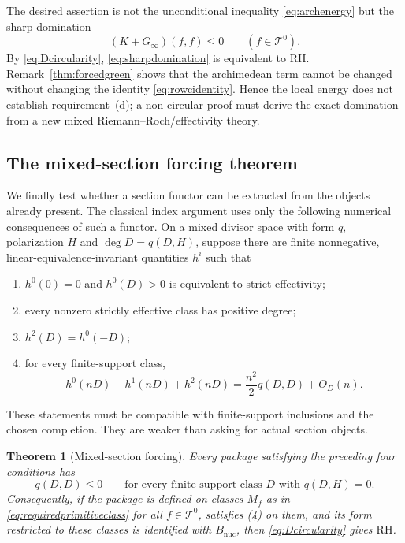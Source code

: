 \documentclass[11pt]{amsart}
\newtheorem{theorem}{Theorem}[section]
\theoremstyle{definition}
\theoremstyle{remark}
\newcommand{\RH}{\mathrm{RH}}
\begin{document}
The desired assertion is not the unconditional inequality
\eqref{eq:archenergy} but the sharp domination
\begin{equation}\label{eq:sharpdomination}
 (K+G_\infty)(f,f)\le0\qquad(f\in\mathcal T^0).
\end{equation}
By \eqref{eq:Dcircularity}, \eqref{eq:sharpdomination} is equivalent to
$\RH$.  Remark~\ref{thm:forcedgreen} shows that the archimedean term cannot
be changed without changing the identity \eqref{eq:rowcidentity}.  Hence the
local energy does not establish requirement~(d); a non-circular proof must derive the exact domination from a
new mixed Riemann--Roch/effectivity theory.

\subsection{The mixed-section forcing theorem}

We finally test whether a section functor can be extracted from the objects
already present.  The classical index argument uses only the following
numerical consequences of such a functor.  On a mixed divisor space with
form $q$, polarization $H$ and $\deg D=q(D,H)$, suppose there are finite
nonnegative, linear-equivalence-invariant quantities $h^i$ such that
\begin{enumerate}
\item $h^0(0)=0$ and $h^0(D)>0$ is equivalent to strict effectivity;
\item every nonzero strictly effective class has positive degree;
\item $h^2(D)=h^0(-D)$;
\item for every finite-support class,
\begin{equation}\label{eq:mixedRRminimum}
 h^0(nD)-h^1(nD)+h^2(nD)
 =\frac{n^2}{2}q(D,D)+O_D(n).
\end{equation}
\end{enumerate}
These statements must be compatible with finite-support inclusions and the
chosen completion.  They are weaker than asking for actual section objects.

\begin{theorem}[Mixed-section forcing]
\label{thm:mixedsectionforcing}
Every package satisfying the preceding four conditions has
\[
 q(D,D)\le0\qquad\text{for every finite-support class $D$ with }q(D,H)=0.
\]
Consequently, if the package is defined on classes $M_f$ as in
\eqref{eq:requiredprimitiveclass} for all $f\in\mathcal T^0$, satisfies (4)
on them, and its form restricted to these classes is identified with
$B_{\mathrm{nuc}}$, then \eqref{eq:Dcircularity} gives $\RH$.
\end{theorem}
\end{document}
